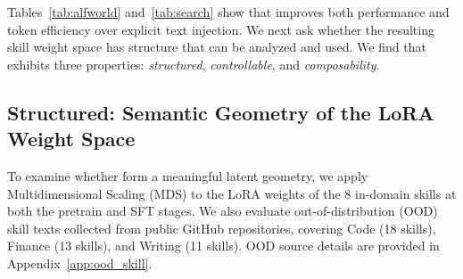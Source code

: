 
Tables~\ref{tab:alfworld} and~\ref{tab:search} show that \method{} improves both performance and token efficiency over explicit text injection. We next ask whether the resulting skill weight space has structure that can be analyzed and used. We find that \method{} exhibits three properties: \emph{structured}, \emph{controllable}, and \emph{composability}.



\subsection{Structured: Semantic Geometry of the LoRA Weight Space}
To examine whether \method{} form a meaningful latent geometry, we apply Multidimensional Scaling (MDS) to the LoRA weights of the 8 in-domain skills at both the pretrain and SFT stages. We also evaluate out-of-distribution (OOD) skill texts collected from public GitHub repositories, covering Code (18 skills), Finance (13 skills), and Writing (11 skills). OOD source details are provided in Appendix~\ref{app:ood_skill}.

